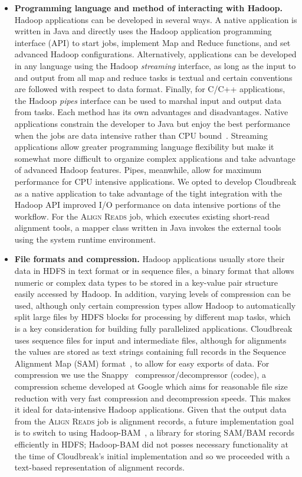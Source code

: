 \begin{itemize}
\item \textbf{Programming language and method of interacting with Hadoop.} Hadoop applications can be developed in several ways. A native application is written in Java and directly uses the Hadoop application programming interface (API) to start jobs, implement Map and Reduce functions, and set advanced Hadoop configurations. Alternatively, applications can be developed in any language using the Hadoop \emph{streaming} interface, as long as the input to and output from all map and reduce tasks is textual and certain conventions are followed with respect to data format. Finally, for C/C++ applications, the Hadoop \emph{pipes} interface can be used to marshal input and output data from tasks. Each method has its own advantages and disadvantages. Native applications constrain the developer to Java but enjoy the best performance when the jobs are data intensive rather than CPU bound~\cite{Ding:2011:MCM:2103380.2103444}. Streaming applications allow greater programming language flexibility but make it somewhat more difficult to organize complex applications and take advantage of advanced Hadoop features. Pipes, meanwhile, allow for maximum performance for CPU intensive applications. We opted to develop Cloudbreak as a native application to take advantage of the tight integration with the Hadoop API improved I/O performance on data intensive portions of the workflow. For the \textsc{Align Reads} job, which executes existing short-read alignment tools, a mapper class written in Java invokes the external tools using the system runtime environment.

\item \textbf{File formats and compression.} Hadoop applications usually store their data in HDFS in text format or in sequence files, a binary format that allows numeric or complex data types to be stored in a key-value pair structure easily accessed by Hadoop. In addition, varying levels of compression can be used, although only certain compression types allow Hadoop to automatically split large files by HDFS blocks for processing by different map tasks, which is a key consideration for building fully parallelized applications. Cloudbreak uses sequence files for input and intermediate files, although for alignments the values are stored as text strings containing full records in the Sequence Alignment Map (SAM) format~\cite{Li:2009vz}, to allow for easy exports of data. For compression we use the Snappy~\cite{snappy} compressor/decompressor (codec), a compression scheme developed at Google which aims for reasonable file size reduction with very fast compression and decompression speeds. This makes it ideal for data-intensive Hadoop applications. Given that the output data from the \textsc{Align Reads} job is alignment records, a future implementation goal is to switch to using Hadoop-BAM~\cite{Niemenmaa:2012hu}, a library for storing SAM/BAM records efficiently in HDFS; Hadoop-BAM did not posses necessary functionality at the time of Cloudbreak's initial implementation and so we proceeded with a text-based representation of alignment records.


\end{itemize}
